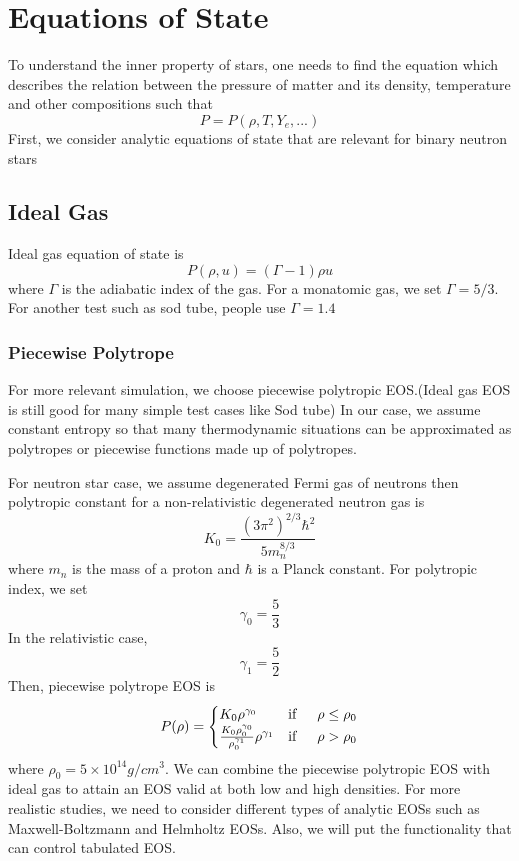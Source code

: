 \documentclass[notes.tex]{subfiles}
\begin{document}
\section{Equations of State}
\label{sec:eos}
To understand the inner property of stars, one needs to find the equation which describes the relation between the pressure of matter and its density, temperature and other compositions such that
\begin{equation}
P = P(\rho, T, Y_e, ...)
\end{equation}
First, we consider analytic equations of state that are relevant for binary neutron stars
\subsection{Ideal Gas}
Ideal gas equation of state is
\begin{equation}
P(\rho,u) = (\Gamma - 1) \rho u
\end{equation}
where $\Gamma$ is the adiabatic index of the gas. For a monatomic gas, we set $\Gamma = 5/3$. For another test such as sod tube, people use $\Gamma = 1.4$
\subsubsection{Piecewise Polytrope}
For more relevant simulation, we choose piecewise polytropic EOS.(Ideal gas EOS is still good for many simple test cases like Sod tube) In our case, we assume constant entropy so that many thermodynamic situations can be approximated as polytropes or piecewise functions made up of polytropes.

For neutron star case, we assume degenerated Fermi gas of neutrons then polytropic constant for a non-relativistic degenerated neutron gas is
\begin{equation}
K_0 = \frac{(3 \pi^2)^{2/3} \hbar^2}{5 m_n^{8/3}}
\end{equation}
where $m_n$ is the mass of a proton and $\hbar$ is a Planck constant. For polytropic index, we set
\begin{equation}
\gamma_0 = \frac{5}{3}
\end{equation}
In the relativistic case,
\begin{equation}
\gamma_1 = \frac{5}{2}
\end{equation}
Then, piecewise polytrope EOS is
\begin{equation}
P(\rho) = \begin{cases}
K_0 \rho^{\gamma_0} & \text{if} \indent \rho \leq \rho_0 \\
\frac{K_0 \rho_0^{\gamma_0}}{\rho_0^{\gamma_1}} \rho^{\gamma_1} & \text{if} \indent \rho > \rho_0
\end{cases}
\end{equation}
where $\rho_0 = 5 \times 10^{14} g/cm^3$. We can combine the piecewise polytropic EOS with ideal gas to attain an EOS valid at both low and high densities. For more realistic studies, we need to consider different types of analytic EOSs such as Maxwell-Boltzmann and Helmholtz EOSs. Also, we will put the functionality that can control tabulated EOS.
\end{document}
